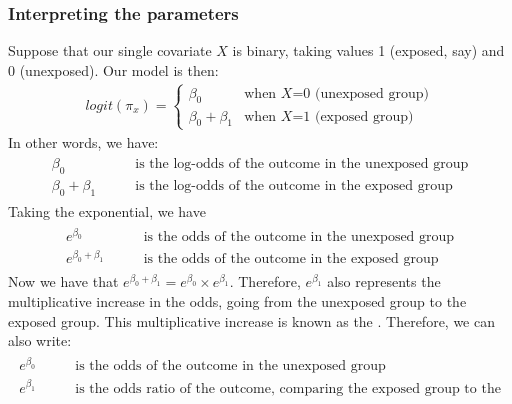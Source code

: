 \documentclass[letterpaper,10pt,english]{jupyterBook}
\begin{document}
\subsubsection{Interpreting the parameters}
\label{\detokenize{15.d. Logistic Regression:interpreting-the-parameters}}
\sphinxAtStartPar
Suppose that our single covariate \(X\) is binary, taking values 1 (exposed, say) and 0 (unexposed). Our model is then:
\begin{equation*}
\begin{split}
logit(\pi_x) =
\begin{cases} \beta_0 &\text{when $X$=0 (unexposed group)} \\
\beta_0 + \beta_1 &\text{when $X$=1 (exposed group)}
\end{cases}
\end{split}
\end{equation*}
\sphinxAtStartPar
In other words, we have:
\begin{equation*}
\begin{split}
\begin{align*}
\beta_0 &\qquad \text{is the log-odds of the outcome in the unexposed group} \\
\beta_0 + \beta_1 &\qquad \text{is the log-odds of the outcome in the exposed group}
\end{align*}
\end{split}
\end{equation*}
\sphinxAtStartPar
Taking the exponential, we have
\begin{equation*}
\begin{split}
\begin{align*}
e^{\beta_0} &\qquad \text{is the odds of the outcome in the unexposed group} \\
e^{\beta_0 + \beta_1} &\qquad \text{is the odds of the outcome in the exposed group}
\end{align*}
\end{split}
\end{equation*}
\sphinxAtStartPar
Now we have that \(e^{\beta_0 + \beta_1}  = e^{\beta_0} \times e^{\beta_1}\). Therefore, \(e^{\beta_1}\) also represents the multiplicative increase in the odds, going from the unexposed group to the exposed group. This multiplicative increase is known as the .  Therefore,  we can also write:
\begin{equation*}
\begin{split}
\begin{align*}
e^{\beta_0} &\qquad \text{is the odds of the outcome in the unexposed group} \\
e^{\beta_1} &\qquad \text{is the odds ratio of the outcome, comparing the exposed group to the unexposed group}
\end{align*}
\end{split}
\end{equation*}
\end{document}
